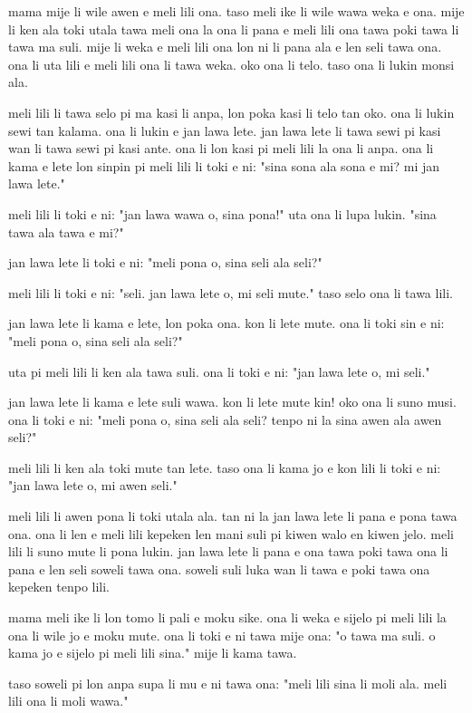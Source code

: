 mama mije li wile awen e meli lili ona. 
taso meli ike li wile wawa weka e ona. 
mije li ken ala toki utala tawa meli ona la ona li pana e meli lili ona tawa poki tawa li tawa ma suli. 
mije li weka e meli lili ona lon ni li pana ala e len seli tawa ona. 
ona li uta lili e meli lili ona li tawa weka. 
oko ona li telo. 
taso ona li lukin monsi ala.

meli lili li tawa selo pi ma kasi li anpa, lon poka kasi li telo tan oko. 
ona li lukin sewi tan kalama. 
ona li lukin e jan lawa lete. 
jan lawa lete li tawa sewi pi kasi wan li tawa sewi pi kasi ante.
ona li lon kasi pi meli lili la ona li anpa. 
ona li kama e lete lon sinpin pi meli lili li toki e ni: 
"sina sona ala sona e mi? 
mi jan lawa lete."

meli lili li toki e ni: 
"jan lawa wawa o, sina pona!" 
uta ona li lupa lukin. 
"sina tawa ala tawa e mi?"

jan lawa lete li toki e ni: 
"meli pona o, sina seli ala seli?"

meli lili li toki e ni: 
"seli. 
jan lawa lete o, mi seli mute."
taso selo ona li tawa lili.

jan lawa lete li kama e lete, lon poka ona. 
kon li lete mute. 
ona li toki sin e ni: 
"meli pona o, sina seli ala seli?"

uta pi meli lili li ken ala tawa suli. 
ona li toki e ni: 
"jan lawa lete o, mi seli."

jan lawa lete li kama e lete suli wawa. 
kon li lete mute kin! 
oko ona li suno musi. 
ona li toki e ni: 
"meli pona o, sina seli ala seli? 
tenpo ni la sina awen ala awen seli?"

meli lili li ken ala toki mute tan lete. 
taso ona li kama jo e kon lili li toki e ni: 
"jan lawa lete o, mi awen seli." 

meli lili li awen pona li toki utala ala. 
tan ni la jan lawa lete li pana e pona tawa ona. 
ona li len e meli lili kepeken len mani suli pi kiwen walo en kiwen jelo. 
meli lili li suno mute li pona lukin. 
jan lawa lete li pana e ona tawa poki tawa ona li pana e len seli soweli tawa ona. 
soweli suli luka wan li tawa e poki tawa ona kepeken tenpo lili.

mama meli ike li lon tomo li pali e moku sike. 
ona li weka e sijelo pi meli lili la ona li wile jo e moku mute. 
ona li toki e ni tawa mije ona: 
"o tawa ma suli. 
o kama jo e sijelo pi meli lili sina." 
mije li kama tawa. 

taso soweli pi lon anpa supa li mu e ni tawa ona: 
"meli lili sina li moli ala. 
meli lili ona li moli wawa."

